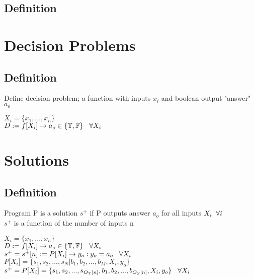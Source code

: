 \documentclass[11pt]{article}
\begin{document}
\subsection{Definition}








\newpage
\section{Decision Problems}

\subsection{Definition}
Define decision problem; a function with inputs $x_i$ and boolean output "answer" $a_o$
\begin{center}
$
X_i = \{x_1,...,x_n\}
$
\\ \vspace{2mm}
$
D := f \lbrack X_i \rbrack \rightarrow a_{o} \in \{\mathbb{T}, \mathbb{F}\} \hspace{3mm} \forall X_i
$
\end{center}







\section{Solutions}

\subsection{Definition}
Program P is a solution $s^{+}$ if P outputs answer $a_o$ for all inputs $X_i \hspace{2mm} \forall i$\\
$s^+$ is a function of the number of inputs n
\begin{center}
\vspace{1mm}
$
X_i = \{x_1,...,x_n\}
$
\\ \vspace{2mm}
$
D := f \lbrack X_i \rbrack \rightarrow a_{o} \in \{\mathbb{T}, \mathbb{F}\} \hspace{3mm} \forall X_i
$
\\ \vspace{2mm}
$
s^+ = s^+\lbrack n \rbrack := P \lbrack X_i \rbrack \rightarrow y_{o} : y_o = a_{o} \hspace{3mm} \forall X_i
$
\\ \vspace{2mm}
$
P \lbrack X_i \rbrack = \{ s_1,s_2,...,s_N| b_1, b_2,...,b_M,X_i,y_o\}
$
\\ \vspace{3mm}
$
s^+ = P \lbrack X_i \rbrack = \{ s_1,s_2,...,s_{O_T \lbrack n \rbrack }, b_1, b_2,...,b_{O_S \lbrack n \rbrack},X_i,y_o \} \hspace{3mm} \forall X_i
$
\end{center}
\end{document}
